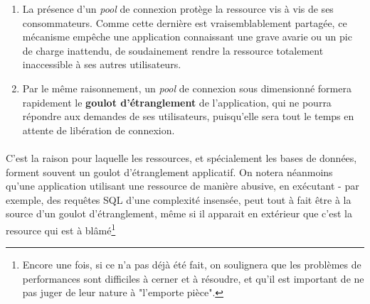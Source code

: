 {  \begin{enumerate}
    \item La présence d'un \textit{pool} de connexion protège la ressource vis à vis de ses
    consommateurs. Comme cette dernière est vraisemblablement partagée, ce mécanisme empêche une
    application connaissant une grave avarie ou un pic de charge inattendu, de soudainement rendre
    la ressource totalement inaccessible à ses autres utilisateurs.
    \item Par le même raisonnement, un \textit{pool} de connexion sous dimensionné formera
    rapidement le \textbf{goulot d'étranglement} de l'application, qui ne pourra répondre aux
    demandes de ses utilisateurs, puisqu'elle sera tout le temps en attente de libération de
    connexion.
  \end{enumerate}

  \paragraph{} C'est la raison pour laquelle les ressources, et spécialement les bases de données,
  forment souvent un goulot d'étranglement applicatif. On notera néanmoins qu'une application
  utilisant une ressource de manière abusive, en exécutant - par exemple, des requêtes SQL d'une
  complexité insensée, peut tout à fait être à la source d'un goulot d'étranglement, même si il
  apparait en extérieur que c'est la resource qui est à blâmé\footnote{Encore une fois, si ce n'a
  pas déjà été fait, on soulignera que les problèmes de performances sont difficiles à cerner et à
  résoudre, et qu'il est important de ne pas juger de leur nature à "l'emporte pièce".}

}




